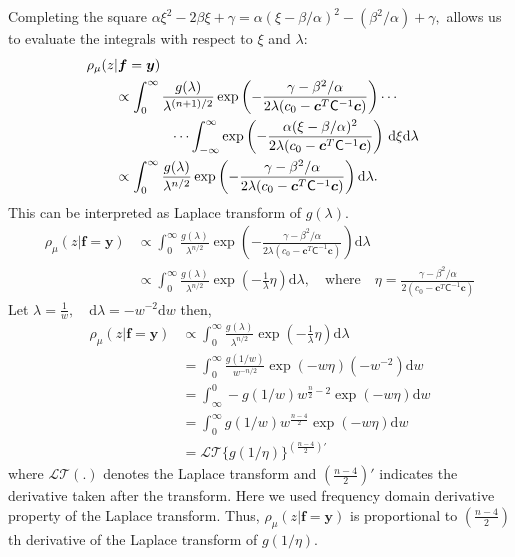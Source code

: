 \documentclass{iitthesis}          %
\newcommand{\bm}[1]{\boldsymbol{#1}}
\newcommand{\dif}[1]{\text{d}{#1}}
\newcommand{\D}[1]{\text{d}{#1}}
\newcommand{\vc}{\bm{c}}
\newcommand{\vf}{\bm{f}}
\newcommand{\vy}{\bm{y}}
\newcommand{\mC}{\mathsf{C}}
\begin{document}
Completing the square $
\alpha \xi^2 -2 \beta \xi + \gamma 
= \alpha (\xi -\beta/\alpha)^2  - (\beta^2/\alpha) + \gamma,
$
allows us to evaluate the integrals with respect to $\xi$ and $\lambda$:
\begin{align*}
\MoveEqLeft{\rho_{\mu}(z | \vf = \vy)} &
\\
& \propto \displaystyle \int_{0}^\infty  \frac{g(\lambda)}{\lambda^{(n+1)/2}}  \exp\left( -\frac{  \gamma - \beta^2/\alpha}{2\lambda(c_0  -\vc ^T \mC^{-1} \vc)} \right)  \cdots 
\\
& \qquad \qquad \cdots \int_{-\infty}^\infty  \exp\left( -\frac{\alpha (\xi -\beta/\alpha)^2}{2\lambda(c_0  -\vc ^T \mC^{-1} \vc)} \right) \, \D \xi \D \lambda 
\\
& \propto \displaystyle \int_{0}^\infty  \frac{g(\lambda)}{\lambda^{n/2}}  \exp\left( -\frac{  \gamma - \beta^2/\alpha}{2\lambda(c_0  -\vc ^T \mC^{-1} \vc)} \right) \D \lambda 
.
\end{align*}
This can be interpreted as Laplace transform of $g(\lambda)$.
\begin{align*}
{\rho_{\mu}(z | \vf = \vy)} 
& \propto \displaystyle \int_{0}^\infty  \frac{g(\lambda)}{\lambda^{n/2}}  \exp\left( -\frac{  \gamma - \beta^2/\alpha}{2\lambda(c_0  -\vc ^T \mC^{-1} \vc)} \right) \D \lambda 
\\
& \propto \int_{0}^\infty \frac{g(\lambda)}{\lambda^{n/2}}
\exp \left(  - \frac{1}{\lambda} \eta \right)
\dif{\lambda}, \quad \text{where} \quad \eta = \frac{  \gamma - \beta^2/\alpha}{2(c_0  -\vc ^T \mC^{-1} \vc)}
\end{align*}
Let $\displaystyle \lambda = \frac{1}{w}, \quad \dif{\lambda} = -w^{-2} \dif{w}$ then,
\begin{align*}
{\rho_{\mu}(z | \vf = \vy)} 
& \propto \int_{0}^\infty \frac{g(\lambda)}{\lambda^{n/2}}
\exp \left(  - \frac{1}{\lambda} \eta \right)
\dif{\lambda} 
\\
&= \int_{0}^\infty \frac{g(1/w)  }{w^{-n/2}}
\exp \left(  - w \eta \right)
(-w^{-2})\dif{w}
\\
&= \int_\infty^0 -g(1/w) w^{\frac n2 - 2}
\exp \left(  - w \eta \right)
\D{w}
\\
&= \int_0^\infty g(1/w) w^{\frac{n-4}2}
\exp \left(  - w \eta \right)
\D{w}
\\
& = \mathcal{LT} \{ g(1/\eta) \}^{(\frac{n-4}2)'}
\end{align*}
where $\mathcal{LT}(.)$ denotes the Laplace transform and $(\frac{n-4}2)'$ indicates the derivative taken after the transform.
Here we used frequency domain derivative property of the Laplace transform. 
Thus, $\rho_{\mu}(z | \vf = \vy)$  is proportional to $(\frac{n-4}{2})$th derivative of the Laplace transform of $g(1/\eta)$.
\end{document}
